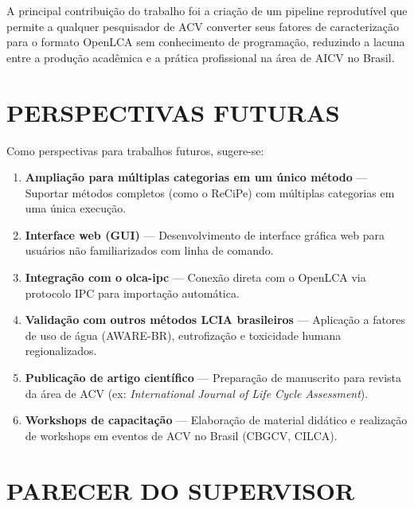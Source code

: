 A principal contribui\c{c}\~ao do trabalho foi a cria\c{c}\~ao de um pipeline reprodut\'ivel que permite a qualquer pesquisador de ACV converter seus fatores de caracteriza\c{c}\~ao para o formato OpenLCA sem conhecimento de programa\c{c}\~ao, reduzindo a lacuna entre a produ\c{c}\~ao acad\^emica e a pr\'atica profissional na \'area de AICV no Brasil.

\section{PERSPECTIVAS FUTURAS}
Como perspectivas para trabalhos futuros, sugere-se:

\begin{enumerate}[label=\arabic*.]
    \item \textbf{Amplia\c{c}\~ao para m\'ultiplas categorias em um \'unico m\'etodo} --- Suportar m\'etodos completos (como o ReCiPe) com m\'ultiplas categorias em uma \'unica execu\c{c}\~ao.
    \item \textbf{Interface web (GUI)} --- Desenvolvimento de interface gr\'afica web para usu\'arios n\~ao familiarizados com linha de comando.
    \item \textbf{Integra\c{c}\~ao com o olca-ipc} --- Conex\~ao direta com o OpenLCA via protocolo IPC para importa\c{c}\~ao autom\'atica.
    \item \textbf{Valida\c{c}\~ao com outros m\'etodos LCIA brasileiros} --- Aplica\c{c}\~ao a fatores de uso de \'agua (AWARE-BR), eutrofiza\c{c}\~ao e toxicidade humana regionalizados.
    \item \textbf{Publica\c{c}\~ao de artigo cient\'ifico} --- Prepara\c{c}\~ao de manuscrito para revista da \'area de ACV (ex: \textit{International Journal of Life Cycle Assessment}).
    \item \textbf{Workshops de capacita\c{c}\~ao} --- Elabora\c{c}\~ao de material did\'atico e realiza\c{c}\~ao de workshops em eventos de ACV no Brasil (CBGCV, CILCA).
\end{enumerate}



\section*{PARECER DO SUPERVISOR}

